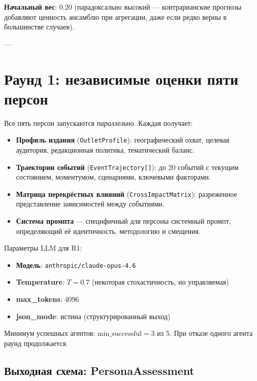 \textbf{Начальный вес}: 0.20 (парадоксально высокий — контрарианские прогнозы добавляют ценность ансамблю при агрегации, даже если редко верны в большинстве случаев).

---


\section{Раунд 1: независимые оценки пяти персон}


Все пять персон запускаются \emph{параллельно}. Каждая получает:

\begin{itemize}
    \item \textbf{Профиль издания} (\texttt{OutletProfile}): географический охват, целевая аудитория, редакционная политика, тематический баланс.
    \item \textbf{Траектории событий} (\texttt{EventTrajectory[]}): до 20 событий с текущим состоянием, моментумом, сценариями, ключевыми факторами.
    \item \textbf{Матрица перекрёстных влияний} (\texttt{CrossImpactMatrix}): разреженное представление зависимостей между событиями.
    \item \textbf{Система промпта} — специфичный для персоны системный промпт, определяющий её идентичность, методологию и смещения.
\end{itemize}

Параметры LLM для R1:
\begin{itemize}
    \item \textbf{Модель}: \texttt{anthropic/claude-opus-4.6}
    \item \textbf{Temperature}: $T = 0.7$ (некоторая стохастичность, но управляемая)
    \item \textbf{max\_tokens}: 4096
    \item \textbf{json\_mode}: истина (структурированный выход)
\end{itemize}

Минимум успешных агентов: $\text{min\_successful} = 3$ из 5. При отказе одного агента раунд продолжается.

\subsection{Выходная схема: PersonaAssessment}

